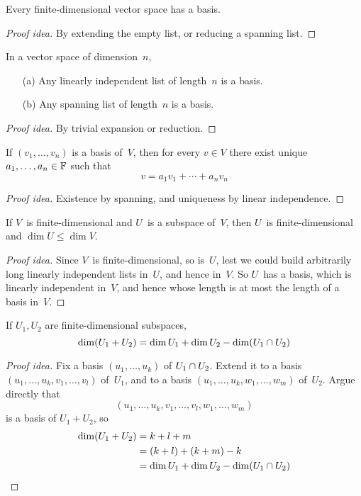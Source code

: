 \begin{cor}
Every finite-dimensional vector space has a basis.
\end{cor}
\begin{proof}[Proof idea]
By extending the empty list, or reducing a spanning list.
\end{proof}

\begin{cor}
In a vector space of dimension~\(n\),
\begin{enumerate}[itemsep=0pt]
\item[(a)] Any linearly independent list of length~\(n\) is a basis.
\item[(b)] Any spanning list of length~\(n\) is a basis.
\end{enumerate}
\end{cor}
\begin{proof}[Proof idea]
By trivial expansion or reduction.
\end{proof}

\begin{thm}
If \((v_1,\ldots,v_n)\) is a basis of~\(V\), then for every \(v\in V\) there exist unique \(a_1,\ldots,a_n\in\mathbb{F}\) such that
\[v=a_1v_1+\cdots+a_nv_n\]
\end{thm}
\begin{proof}[Proof idea]
Existence by spanning, and uniqueness by linear independence.
\end{proof}

\begin{thm}
If \(V\)~is finite-dimensional and \(U\)~is a subspace of~\(V\), then \(U\)~is finite-dimensional and \(\dim U\le\dim V\).
\end{thm}
\begin{proof}[Proof idea]
Since \(V\)~is finite-dimensional, so is~\(U\), lest we could build arbitrarily long linearly independent lists in~\(U\), and hence in~\(V\). So \(U\)~has a basis, which is linearly independent in~\(V\), and hence whose length is at most the length of a basis in~\(V\).
\end{proof}

\begin{thm}
If \(U_1,U_2\) are finite-dimensional subspaces,
\[\dim(U_1+U_2)=\dim U_1+\dim U_2-\dim(U_1\cap U_2)\]
\end{thm}
\begin{proof}[Proof idea]
Fix a basis \((u_1,\ldots,u_k)\) of \(U_1\cap U_2\). Extend it to a basis \((u_1,\ldots,u_k,v_1,\ldots,v_l)\) of~\(U_1\), and to a basis \((u_1,\ldots,u_k,w_1,\ldots,w_m)\) of~\(U_2\). Argue directly that
\[(u_1,\ldots,u_k,v_1,\ldots,v_l,w_1,\ldots,w_m)\]
is a basis of \(U_1+U_2\), so
\begin{align*}
\dim(U_1+U_2)&=k+l+m\\
	&=(k+l)+(k+m)-k\\
	&=\dim U_1+\dim U_2-\dim(U_1\cap U_2)\qedhere
\end{align*}
\end{proof}

